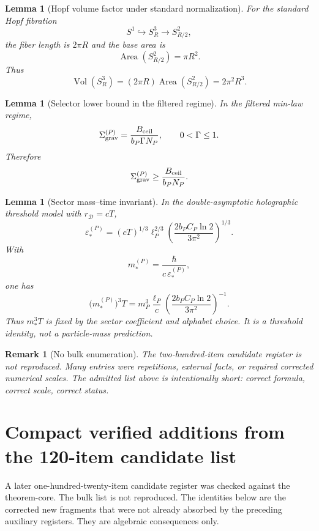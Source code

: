 \documentclass[11pt,a4paper]{article}
\newtheorem{lemma}[theorem]{Lemma}
\newtheorem{remark}[theorem]{Remark}
\begin{document}
\begin{lemma}[Hopf volume factor under standard normalization]
For the standard Hopf fibration
\[
S^1\hookrightarrow S^3_R\to S^2_{R/2},
\]
the fiber length is \(2\pi R\) and the base area is
\[
\operatorname{Area}(S^2_{R/2})=\pi R^2.
\]
Thus
\[
\operatorname{Vol}(S^3_R)
=
(2\pi R)\operatorname{Area}(S^2_{R/2})
=
2\pi^2R^3.
\]
\end{lemma}

\begin{lemma}[Selector lower bound in the filtered regime]
In the filtered min-law regime,
\[
\Sigma_{\rm grav}^{(P)}
=
\frac{B_{\rm ceil}}{b_P\Gamma N_P},
\qquad
0<\Gamma\le1.
\]
Therefore
\[
\Sigma_{\rm grav}^{(P)}
\ge
\frac{B_{\rm ceil}}{b_PN_P}.
\]
\end{lemma}

\begin{lemma}[Sector mass--time invariant]
In the double-asymptotic holographic threshold model with \(r_{\mathcal D}=cT\),
\[
\varepsilon_*^{(P)}
=
(cT)^{1/3}\ell_P^{2/3}
\left(
\frac{2b_PC_P\ln2}{3\pi^2}
\right)^{1/3}.
\]
With
\[
m_*^{(P)}=\frac{\hbar}{c\,\varepsilon_*^{(P)}},
\]
one has
\[
\bigl(m_*^{(P)}\bigr)^3T
=
m_P^3\frac{\ell_P}{c}
\left(
\frac{2b_PC_P\ln2}{3\pi^2}
\right)^{-1}.
\]
Thus \(m_*^3T\) is fixed by the sector coefficient and alphabet choice.  It is a threshold identity, not a particle-mass prediction.
\end{lemma}

\begin{remark}[No bulk enumeration]
The two-hundred-item candidate register is not reproduced.  Many entries were repetitions, external facts, or required corrected numerical scales.  The admitted list above is intentionally short: correct formula, correct scale, correct status.
\end{remark}





\section{Compact verified additions from the 120-item candidate list}
\label{app:compact-verified-additions}

A later one-hundred-twenty-item candidate register was checked against the theorem-core.  The bulk list is not reproduced.  The identities below are the corrected new fragments that were not already absorbed by the preceding auxiliary registers.  They are algebraic consequences only.
\end{document}
